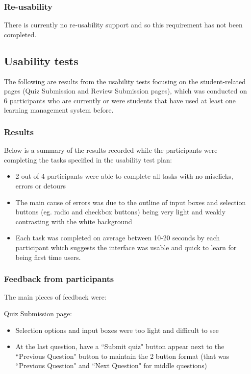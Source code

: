 \subsubsection{Re-usability}
There is currently no re-usability support and so this requirement has not been completed.

\subsection{Usability tests}
The following are results from the usability tests focusing on the student-related pages (Quiz Submission and Review Submission pages), which was conducted on 6 participants who are currently or were students that have used at least one learning management system before.

\subsubsection{Results}
Below is a summary of the results recorded while the participants were completing the tasks specified in the usability test plan:

\begin{itemize}
	\item 2 out of 4 participants were able to complete all tasks with no misclicks, errors or detours
	\item The main cause of errors was due to the outline of input boxes and selection buttons (eg. radio and checkbox buttons) being very light and weakly contrasting with the white background
	\item Each task was completed on average between 10-20 seconds by each participant which suggests the interface was usable and quick to learn for being first time users.
\end{itemize}

\subsubsection{Feedback from participants}
The main pieces of feedback were:

Quiz Submission page:
\begin{itemize}
	\item Selection options and input boxes were too light and difficult to see
	\item At the last question, have a ``Submit quiz" button appear next to the ``Previous Question" button to maintain the 2 button format (that was ``Previous Question" and ``Next Question" for middle questions)
\end{itemize}

